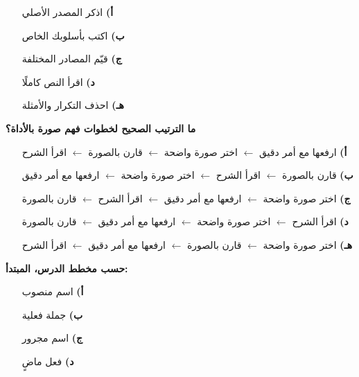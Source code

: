 \documentclass[11pt,a4paper]{article}
\begin{document}
\begin{multicols}{2}
\begin{minipage}{\linewidth}
\begin{itemize}[leftmargin=0.95cm, labelsep=4pt, itemsep=0pt, topsep=2pt, parsep=0pt]
  \item[\textbf{أ)}] اذكر المصدر الأصلي
  \item[\textbf{ب)}] اكتب بأسلوبك الخاص
  \item[\textbf{ج)}] قيّم المصادر المختلفة
  \item[\textbf{د)}] اقرأ النص كاملًا
  \item[\textbf{هـ)}] احذف التكرار والأمثلة
\end{itemize}
\end{minipage}\par\vspace{7pt plus 4pt}
\noindent\begin{minipage}{\linewidth}
\hangindent=0.7cm\textbf{ما الترتيب الصحيح لخطوات فهم صورة بالأداة؟}
\begin{itemize}[leftmargin=0.95cm, labelsep=4pt, itemsep=0pt, topsep=2pt, parsep=0pt]
  \item[\textbf{أ)}] ارفعها مع أمر دقيق $\leftarrow$ اختر صورة واضحة $\leftarrow$ قارن بالصورة $\leftarrow$ اقرأ الشرح
  \item[\textbf{ب)}] قارن بالصورة $\leftarrow$ اقرأ الشرح $\leftarrow$ اختر صورة واضحة $\leftarrow$ ارفعها مع أمر دقيق
  \item[\textbf{ج)}] اختر صورة واضحة $\leftarrow$ ارفعها مع أمر دقيق $\leftarrow$ اقرأ الشرح $\leftarrow$ قارن بالصورة
  \item[\textbf{د)}] اقرأ الشرح $\leftarrow$ اختر صورة واضحة $\leftarrow$ ارفعها مع أمر دقيق $\leftarrow$ قارن بالصورة
  \item[\textbf{هـ)}] اختر صورة واضحة $\leftarrow$ قارن بالصورة $\leftarrow$ ارفعها مع أمر دقيق $\leftarrow$ اقرأ الشرح
\end{itemize}
\end{minipage}\par\vspace{7pt plus 4pt}
\noindent\begin{minipage}{\linewidth}
\hangindent=0.7cm\textbf{حسب مخطط الدرس، المبتدأ:}
\begin{itemize}[leftmargin=0.95cm, labelsep=4pt, itemsep=0pt, topsep=2pt, parsep=0pt]
  \item[\textbf{أ)}] اسم منصوب
  \item[\textbf{ب)}] جملة فعلية
  \item[\textbf{ج)}] اسم مجرور
  \item[\textbf{د)}] فعل ماضٍ

\end{itemize}
\end{minipage}
\end{multicols}
\end{document}
